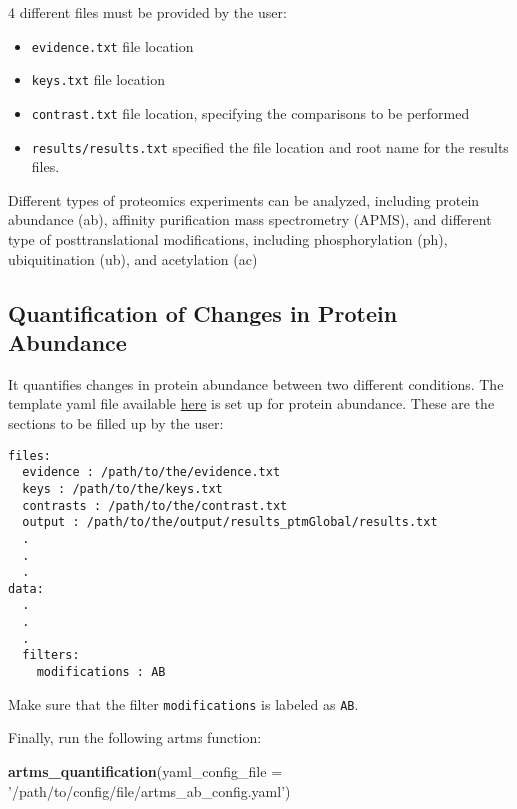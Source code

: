 \documentclass[]{article}
\newenvironment{Shaded}{\begin{snugshade}}{\end{snugshade}}
\newcommand{\KeywordTok}[1]{\textcolor[rgb]{0.13,0.29,0.53}{\textbf{#1}}}
\newcommand{\DataTypeTok}[1]{\textcolor[rgb]{0.13,0.29,0.53}{#1}}
\newcommand{\StringTok}[1]{\textcolor[rgb]{0.31,0.60,0.02}{#1}}
\newcommand{\NormalTok}[1]{#1}
\providecommand{\tightlist}{%
  \setlength{\itemsep}{0pt}\setlength{\parskip}{0pt}}
\begin{document}
4 different files must be provided by the user:

\begin{itemize}
\tightlist
\item
  \texttt{evidence.txt} file location
\item
  \texttt{keys.txt} file location
\item
  \texttt{contrast.txt} file location, specifying the comparisons to be
  performed
\item
  \texttt{results/results.txt} specified the file location and root name
  for the results files.
\end{itemize}

Different types of proteomics experiments can be analyzed, including
protein abundance (ab), affinity purification mass spectrometry (APMS),
and different type of posttranslational modifications, including
phosphorylation (ph), ubiquitination (ub), and acetylation (ac)

\subsection{Quantification of Changes in Protein
Abundance}\label{quantification-of-changes-in-protein-abundance}

It quantifies changes in protein abundance between two different
conditions. The template yaml file available
\href{../data-raw/artms_config.yaml}{here} is set up for protein
abundance. These are the sections to be filled up by the user:

\begin{verbatim}
files:
  evidence : /path/to/the/evidence.txt
  keys : /path/to/the/keys.txt
  contrasts : /path/to/the/contrast.txt
  output : /path/to/the/output/results_ptmGlobal/results.txt
  .
  .
  .
data:
  .
  .
  .
  filters:
    modifications : AB 
\end{verbatim}

Make sure that the filter \texttt{modifications} is labeled as
\texttt{AB}.

Finally, run the following artms function:

\begin{Shaded}
\begin{Highlighting}[]
\KeywordTok{artms_quantification}\NormalTok{(}\DataTypeTok{yaml_config_file =} \StringTok{'/path/to/config/file/artms_ab_config.yaml'}\NormalTok{)}
\end{Highlighting}
\end{Shaded}
\end{document}
